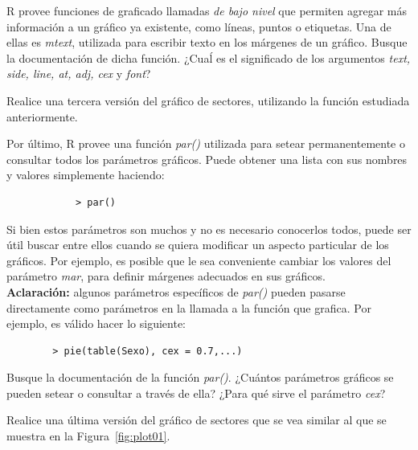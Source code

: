 \documentclass{prob}
\begin{document}
\begin{problema}
	\begin{parte}
		R provee funciones de graficado llamadas \textit{de bajo nivel} que permiten agregar más información a un gráfico ya existente, como líneas, puntos o etiquetas. Una de ellas es \textit{mtext}, utilizada para escribir texto en los márgenes de un gráfico. Busque la documentación de dicha función. ¿Cuaĺ es el significado de los argumentos \textit{text, side, line, at, adj, cex} y \textit{font}? 
	\end{parte}
	
	\begin{parte}
		Realice una tercera versión del gráfico de sectores, utilizando la función estudiada anteriormente.
	\end{parte}
	
	\begin{parte}
		Por último, R provee una función \textit{par()} utilizada para setear permanentemente o consultar todos los parámetros gráficos. Puede obtener una lista con sus nombres y valores simplemente haciendo:
		\begin{verbatim}
		    > par()
		\end{verbatim}
	Si bien estos parámetros son muchos y no es necesario conocerlos todos, puede ser útil buscar entre ellos cuando se quiera modificar un aspecto particular de los gráficos. Por ejemplo, es posible que le sea conveniente cambiar los valores del parámetro \textit{mar}, para definir márgenes adecuados en sus gráficos. \\
	
	\textbf{Aclaración:} algunos parámetros específicos de \textit{par()} pueden pasarse directamente como parámetros en la llamada a la función que grafica. Por ejemplo, es válido hacer lo siguiente:
	\begin{verbatim}
	    > pie(table(Sexo), cex = 0.7,...)
	\end{verbatim}
\medskip	
	Busque la documentación de la función \textit{par()}. ¿Cuántos parámetros gráficos se pueden setear o consultar a través de ella? ¿Para qué sirve el parámetro \textit{cex}?
	\end{parte}
		
	\begin{parte}	
	Realice una última versión del gráfico de sectores que se vea similar al que se muestra en la Figura~\ref{fig:plot01}.
	\end{parte}

	\end{problema}
	
\end{document}
